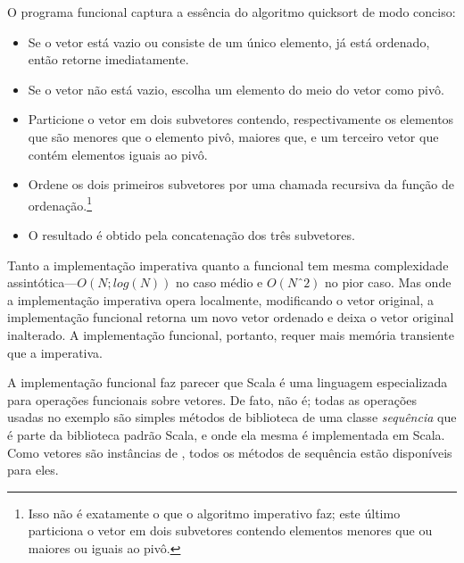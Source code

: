 O programa funcional captura a essência do algoritmo quicksort de modo conciso:
\begin{itemize}
\item Se o vetor está vazio ou consiste de um único elemento, já está ordenado,
      então retorne imediatamente.
\item Se o vetor não está vazio, escolha um elemento do meio do vetor como pivô.
\item Particione o vetor em dois subvetores contendo, respectivamente os elementos
 que são menores que o elemento pivô, maiores que, e um terceiro vetor que contém
 elementos iguais ao pivô.
\item Ordene os dois primeiros subvetores por uma chamada recursiva da função de 
ordenação.\footnote{Isso não é exatamente o que o algoritmo imperativo faz; este 
último particiona o vetor em dois subvetores contendo elementos menores que ou 
maiores ou iguais ao pivô.}
\item O resultado é obtido pela concatenação dos três subvetores.
\end{itemize}

Tanto a implementação imperativa quanto a funcional tem mesma complexidade
assintótica---$O(N;log(N))$ no caso médio e $O(Nˆ2)$ no pior caso. Mas onde
a implementação imperativa opera localmente, modificando o vetor original,
a implementação funcional retorna um novo vetor ordenado e deixa o vetor
original inalterado. A implementação funcional, portanto, requer mais
memória  transiente que a imperativa.

A implementação funcional faz parecer que Scala é uma linguagem
especializada para operações funcionais sobre vetores. De fato, não é;
todas as operações usadas no exemplo são simples métodos de biblioteca
de uma classe {\em sequência}  que é parte da biblioteca
padrão Scala, e onde ela mesma é implementada em Scala. Como vetores são 
instâncias de \verb@Seq@, todos os métodos de sequência estão disponíveis
para eles.

